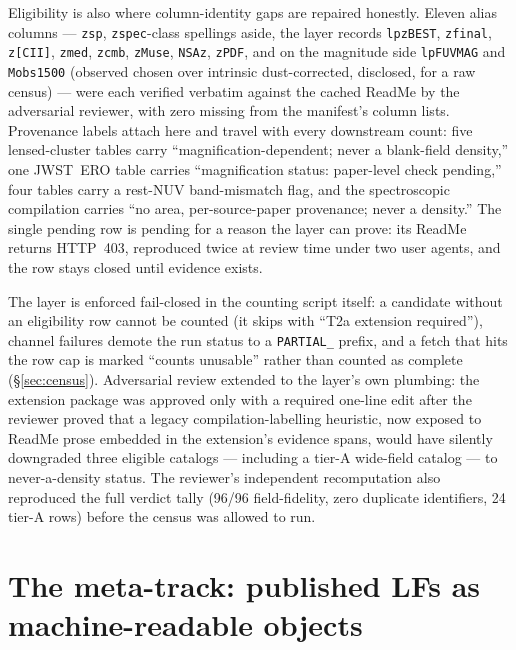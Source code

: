 \documentclass[twocolumn]{aastex702}
\begin{document}
Eligibility is also where column-identity gaps are repaired honestly. Eleven alias
columns --- \texttt{zsp}, \texttt{zspec}-class spellings aside, the layer records
\texttt{lpzBEST}, \texttt{zfinal}, \texttt{z[CII]}, \texttt{zmed}, \texttt{zcmb},
\texttt{zMuse}, \texttt{NSAz}, \texttt{zPDF}, and on the magnitude side
\texttt{lpFUVMAG} and \texttt{Mobs1500} (observed chosen over intrinsic
dust-corrected, disclosed, for a raw census) --- were each verified verbatim against the
cached ReadMe by the adversarial reviewer, with zero missing from the manifest's column
lists. Provenance labels attach here and travel with every downstream count: five
lensed-cluster tables carry ``magnification-dependent; never a blank-field density,''
one JWST~ERO table carries ``magnification status: paper-level check pending,'' four
tables carry a rest-NUV band-mismatch flag, and the spectroscopic compilation carries
``no area, per-source-paper provenance; never a density.'' The single pending row is
pending for a reason the layer can prove: its ReadMe returns HTTP~403, reproduced twice
at review time under two user agents, and the row stays closed until evidence exists.

The layer is enforced fail-closed in the counting script itself: a candidate without an
eligibility row cannot be counted (it skips with ``T2a extension required''), channel
failures demote the run status to a \texttt{PARTIAL\_} prefix, and a fetch that hits the
row cap is marked ``counts unusable'' rather than counted as complete
(\S\ref{sec:census}). Adversarial review extended to the layer's own plumbing: the
extension package was approved only with a required one-line edit after the reviewer
proved that a legacy compilation-labelling heuristic, now exposed to ReadMe prose
embedded in the extension's evidence spans, would have silently downgraded three
eligible catalogs --- including a tier-A wide-field catalog --- to never-a-density
status. The reviewer's independent recomputation also reproduced the full verdict tally
(96/96 field-fidelity, zero duplicate identifiers, 24 tier-A rows) before the census
was allowed to run.

\section{The meta-track: published LFs as machine-readable objects} \label{sec:meta}
\end{document}
